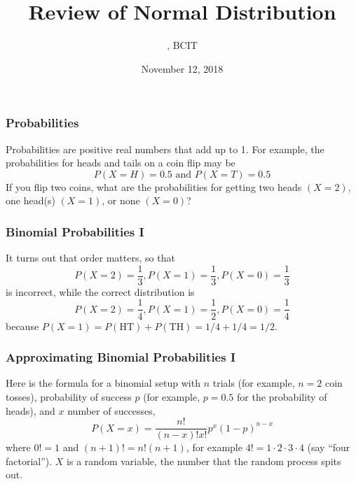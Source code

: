 \documentclass[xcolor=dvipsnames]{beamer}
\title{Review of Normal Distribution}
\subtitle{{\CourseNumber}, BCIT}
\author{\CourseName}
\date{November 12, 2018}
\begin{document}
\begin{frame}
  \titlepage
\end{frame}

\begin{frame}
  \frametitle{Probabilities}
\alert{Probabilities} are positive real numbers that add up to 1. For example,
the probabilities for heads and tails on a coin flip may be
\begin{equation}
  \label{eq:veejooni}
  P(X=H)=0.5\mbox{ and }P(X=T)=0.5
\end{equation}
If you flip two coins, what are the probabilities for getting two
heads $(X=2)$, one head(s) $(X=1)$, or none $(X=0)$?
\end{frame}

\begin{frame}
  \frametitle{Binomial Probabilities I}
It turns out that order matters, so that
\begin{equation}
  \label{eq:eijietha}
  P(X=2)=\frac{1}{3},P(X=1)=\frac{1}{3},P(X=0)=\frac{1}{3}
\end{equation}
is incorrect, while the correct distribution is
\begin{equation}
  \label{eq:eepuneeb}
  P(X=2)=\frac{1}{4},P(X=1)=\frac{1}{2},P(X=0)=\frac{1}{4}
\end{equation}
because $P(X=1)=P(\mbox{HT})+P(\mbox{TH})=1/4+1/4=1/2$.
\end{frame}

\begin{frame}
  \frametitle{Approximating Binomial Probabilities I}
Here is the formula for a \alert{binomial} setup with $n$ trials (for example,
$n=2$ coin tosses), probability of success $p$ (for example, $p=0.5$ for the
probability of heads), and $x$ number of successes,
\begin{equation}
  \label{eq:iedohdah}
  P(X=x)=\frac{n!}{(n-x)!x!}p^{x}(1-p)^{n-x}
\end{equation}
where $0!=1$ and $(n+1)!=n!(n+1)$, for example
$4!=1\cdot{}2\cdot{}3\cdot{}4$ (say ``four factorial''). $X$ is a
\alert{random variable}, the number that the random process spits out.
\end{frame}
\end{document}
